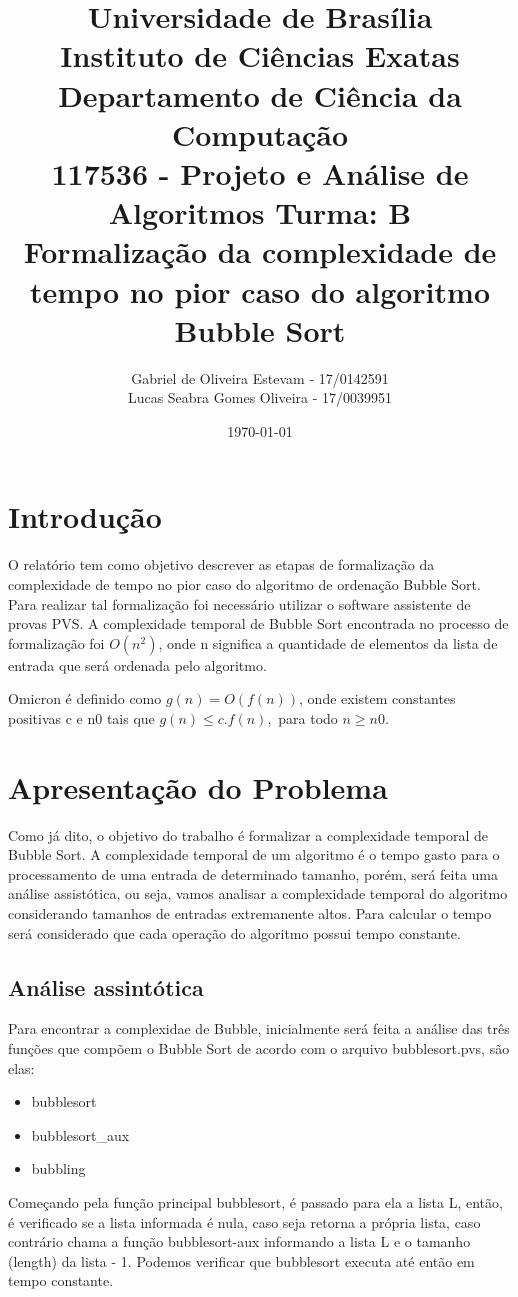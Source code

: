 \documentclass[12pt]{article}
\title{{\large Universidade de Brasília \\ Instituto de Ciências Exatas \\
Departamento de Ciência da Computação} \\[1cm]
117536 - Projeto e Análise de Algoritmos Turma: B\\[.5cm]
{\bf Formalização da complexidade de tempo no pior caso do algoritmo Bubble Sort}}
\author{Gabriel de Oliveira Estevam - 17/0142591 \\
        Lucas Seabra Gomes Oliveira - 17/0039951}
\date{\today}
\begin{document}
\maketitle
\newpage

\section{Introdução}
O relatório tem como objetivo descrever as etapas de formalização da complexidade de tempo no pior caso do algoritmo de ordenação Bubble Sort. Para realizar tal formalização foi necessário utilizar o software assistente de provas PVS. A complexidade temporal de Bubble Sort encontrada no processo de formalização foi $O(n^2)$, onde n significa a quantidade de elementos da lista de entrada que será ordenada pelo algoritmo.  

Omicron é definido como $g(n) = O(f(n))$, onde existem constantes positivas c e n0 tais que $g(n) \leq c.f(n),$ para todo $n \geq n0$.

\section{Apresentação do Problema}
Como já dito, o objetivo do trabalho é formalizar a complexidade temporal de Bubble Sort. A complexidade temporal de um algoritmo é o tempo gasto para o processamento de uma entrada de determinado tamanho, porém, será feita uma análise assistótica, ou seja, vamos analisar a complexidade temporal do algoritmo considerando tamanhos de entradas extremanente altos. Para calcular o tempo será considerado que cada operação do algoritmo possui tempo constante.  

\subsection{Análise assintótica}


Para encontrar a complexidae de Bubble, inicialmente será feita a análise das três funções que compõem o Bubble Sort de acordo com o arquivo bubblesort.pvs, são elas:

\begin{itemize}
    \item bubblesort
    \item bubblesort\_aux
    \item bubbling
\end{itemize}

Começando pela função principal bubblesort, é passado para ela a lista L, então, é verificado se a lista informada é nula, caso seja retorna a própria lista, caso contrário chama a função bubblesort-aux informando a lista L e o tamanho (length) da lista - 1. Podemos verificar que bubblesort executa até então em tempo constante.
\end{document}
